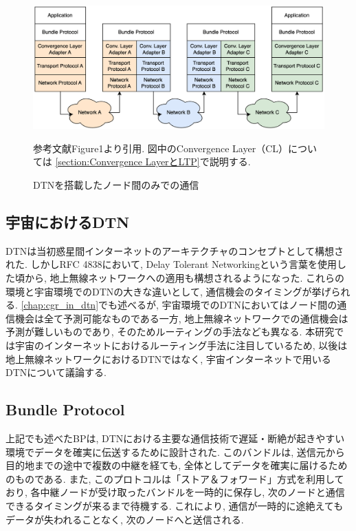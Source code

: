 
\begin{figure}[tbh]
    \centering
    \includegraphics[width=0.7\textheight]{img/dtnprotocolstack.pdf}
    \caption{DTNを搭載したノード間のみでの通信}
    \label{fig:dtnprotocolstack}
    \begin{minipage}{\textwidth}
        \raggedright
        \vspace{3mm}
        参考文献\cite{bundle_protocol_architecture}Figure1より引用. 
        図中のConvergence Layer（CL）については
        \ref{section:Convergence LayerとLTP}で説明する.
    \end{minipage}
\end{figure}

\subsection{宇宙におけるDTN}
DTNは当初惑星間インターネットのアーキテクチャのコンセプトとして構想された. しかしRFC 4838\cite{rfc4838}において, 
Delay Tolerant Networkingという言葉を使用した頃から, 地上無線ネットワークへの適用も構想されるようになった. 
これらの環境と宇宙環境でのDTNの大きな違いとして, 通信機会のタイミングが挙げられる. 
\ref{chap:cgr_in_dtn}でも述べるが, 
宇宙環境でのDTNにおいてはノード間の通信機会は全て予測可能なものである一方, 
地上無線ネットワークでの通信機会は予測が難しいものであり, そのためルーティングの手法なども異なる. 
本研究では宇宙のインターネットにおけるルーティング手法に注目しているため, 以後は地上無線ネットワークにおけるDTNではなく, 
宇宙インターネットで用いるDTNについて議論する. 

\subsection{Bundle Protocol}
\label{subsection:Bundle Protocol}
上記でも述べたBPは, DTNにおける主要な通信技術で遅延・断絶が起きやすい環境でデータを確実に伝送するために設計された. 
このバンドルは,  送信元から目的地までの途中で複数の中継を経ても, 全体としてデータを確実に届けるためのものである.  
また, このプロトコルは「ストア＆フォワード」方式を利用しており,  各中継ノードが受け取ったバンドルを一時的に保存し,  
次のノードと通信できるタイミングが来るまで待機する.  これにより, 通信が一時的に途絶えてもデータが失われることなく,  次のノードへと送信される. 

